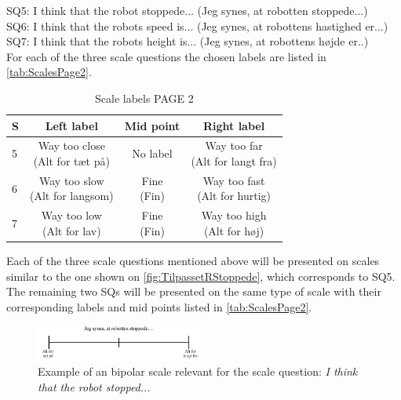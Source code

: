 \noindent
% 
SQ5: I think that the robot stoppede... (Jeg synes, at robotten stoppede...)\\
SQ6: I think that the robots speed is... (Jeg synes, at robottens hastighed er...)\\ 
SQ7: I think that the robots height is... (Jeg synes, at robottens højde er..)\\
For each of the three scale questions the chosen labels are listed in \autoref{tab:ScalesPage2}.  
%
\begin{table}[H]
	\centering
\caption{Scale labels PAGE 2}
	\label{tab:ScalesPage2} 
	\begin{tabular}{l|c|c|c}
		S     & Left label & Mid point & Right label \\\hline
		5   & \makecell{Way too close\\(Alt for tæt på)}  & No label & \makecell{Way too far \\(Alt for langt fra)}        \\\hline
		6   & \makecell{Way too slow\\(Alt for langsom)} & \makecell{Fine\\(Fin)} & \makecell{Way too fast \\(Alt for hurtig)}         \\\hline
		7   & \makecell{Way too low \\(Alt for lav)} & \makecell{Fine\\(Fin)} & \makecell{Way too high\\(Alt for høj)}                
	\end{tabular}        
\end{table}
\noindent
%
Each of the three scale questions mentioned above will be presented on scales similar to the one shown on \autoref{fig:TilpassetRStoppede}, which corresponds to SQ5. The remaining two SQs will be presented on the same type of scale with their corresponding labels and mid points listed in \autoref{tab:ScalesPage2}.  
%
\begin{figure}[H]
\centering
\includegraphics[width = 0.49\textwidth]{Figure/TilpassetRStoppede}
\setlength{} 
\caption{Example of an bipolar scale relevant for the scale question: \textit{I think that the robot stopped...}}
\label{fig:TilpassetRStoppede}
\end{figure}
\noindent
% 
